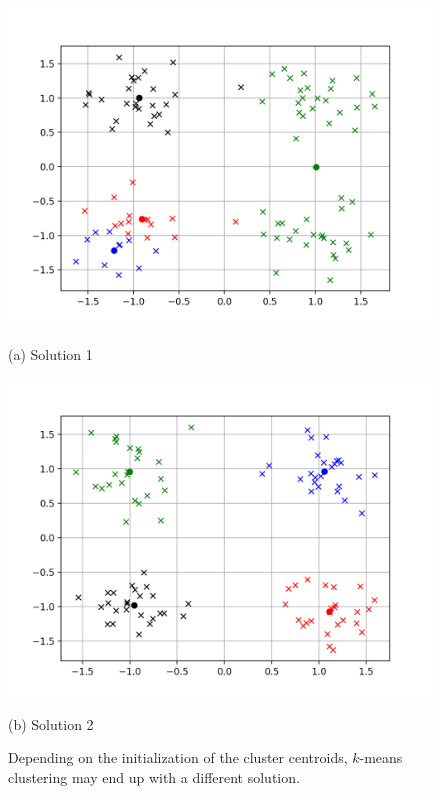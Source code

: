 \documentclass{report}
\begin{document}
\begin{figure}[t]
    \begin{minipage}{0.48\textwidth}
        \centering
        \includegraphics[width=\columnwidth]{./figures/kmeans_local.png}

        (a) Solution 1
    \end{minipage}
    \hfill
    \begin{minipage}{0.48\textwidth}
        \centering
        \includegraphics[width=\columnwidth]{./figures/kmeans_local2.png}

        (b) Solution 2
    \end{minipage}
    \caption{
        \label{fig:kmeans_local}
        Depending on the initialization of the cluster centroids, $k$-means
        clustering may end up with a different solution.
    }
\end{figure}
\end{document}
